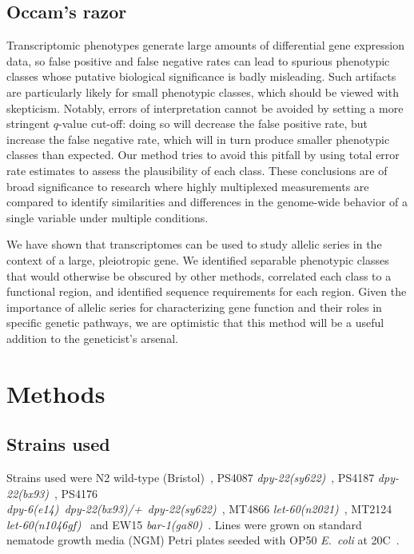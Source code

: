 \documentclass[9pt,twocolumn,twoside]{gsajnl}
\newcommand{\ecol}{\emph{E.~coli}}
\newcommand{\gene}[1]{\mbox{\emph{#1}}}
\newcommand{\dpy}[1]{\gene{dpy-22#1}}
\newcommand{\bx}{\dpy{(bx93)}}
\newcommand{\sy}{\dpy{(sy622)}}
\begin{document}
\subsection*{Occam's razor}
Transcriptomic phenotypes generate large amounts of differential gene expression
data, so false positive and false negative rates can lead to spurious phenotypic
classes whose putative biological significance is badly misleading. Such
artifacts are particularly likely for small phenotypic classes, which should be
viewed with skepticism. Notably, errors of interpretation cannot be avoided by
setting a more stringent $q$-value cut-off: doing so will decrease the false
positive rate, but increase the false negative rate, which will in turn produce
smaller phenotypic classes than expected. Our method tries to avoid this pitfall
by using total error rate estimates to assess the plausibility of each class.
These conclusions are of broad significance to research where highly multiplexed
measurements are compared to identify similarities and differences in the
genome-wide behavior of a single variable under multiple conditions.

We have shown that transcriptomes can be used to study allelic series in the
context of a large, pleiotropic gene. We identified separable phenotypic classes
that would otherwise be obscured by other methods, correlated each class to a
functional region, and identified sequence requirements for each region. Given
the importance of allelic series for characterizing gene function and their
roles in specific genetic pathways, we are optimistic that this method will be a
useful addition to the geneticist's arsenal.

\section*{Methods}\label{sec:methods}

\subsection*{Strains used}
Strains used were N2 wild-type (Bristol)~\citep{Brenner1974},
PS4087 \sy{}~\citep{Moghal2003},
PS4187 \bx{}~\citep{Zhang2000},
PS4176\\ \gene{dpy-6(e14) dpy-22(bx93)/+ dpy-22(sy622)}~\citep{Moghal2003},
MT4866 \gene{let-60(n2021)}~\citep{Beitel1990a},
MT2124 \gene{let-60(n1046gf)}~\citep{Beitel1990a} and
EW15 \gene{bar-1(ga80)}~\citep{Eisenmann1998}.
Lines were grown on standard nematode growth media (NGM) Petri plates seeded
with OP50 \ecol{} at 20\degree{}C~\citep{Brenner1974}.
\end{document}
